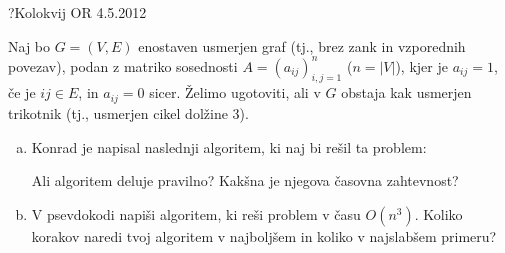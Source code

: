 \begin{naloga}{?}{Kolokvij OR 4.5.2012}
\begin{vprasanje}
Naj bo $G = (V, E)$ enostaven usmerjen graf
(tj., brez zank in vzporednih povezav),
podan z matriko sosednosti $A = (a_{ij})_{i,j=1}^n$ ($n = |V|$),
kjer je $a_{ij} = 1$, če je $ij \in E$, in $a_{ij} = 0$ sicer.
Želimo ugotoviti, ali v $G$ obstaja kak usmerjen trikotnik
(tj., usmerjen cikel dolžine $3$).
\begin{enumerate}[(a)]
\item Konrad je napisal naslednji algoritem, ki naj bi rešil ta problem:
\begin{small}
\begin{algorithmic}
                    \State {}
                \EndIf
            \EndFor
        \EndFor
    \EndFor
\EndFor
\State {}
\end{algorithmic}
\end{small}
Ali algoritem deluje pravilno?
Kakšna je njegova časovna zahtevnost?

\item V psevdokodi napiši algoritem, ki reši problem v času $O(n^3)$.
Koliko korakov naredi tvoj algoritem v najboljšem
in koliko v najslabšem primeru?
\end{enumerate}
\end{vprasanje}
\begin{odgovor}
\end{odgovor}
\end{naloga}


